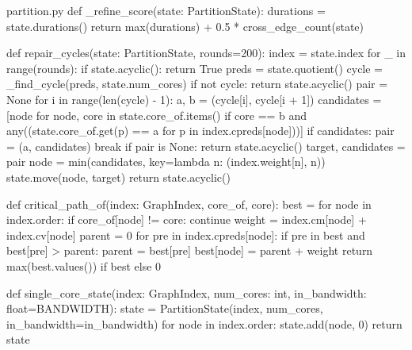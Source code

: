 \begin{Python}{partition.py}
def _refine_score(state: PartitionState):
    durations = state.durations()
    return max(durations) + 0.5 * cross_edge_count(state)

def repair_cycles(state: PartitionState, rounds=200):
    index = state.index
    for _ in range(rounds):
        if state.acyclic():
            return True
        preds = state.quotient()
        cycle = _find_cycle(preds, state.num_cores)
        if not cycle:
            return state.acyclic()
        pair = None
        for i in range(len(cycle) - 1):
            a, b = (cycle[i], cycle[i + 1])
            candidates = [node for node, core in state.core_of.items() if core == b and any((state.core_of.get(p) == a for p in index.cpreds[node]))]
            if candidates:
                pair = (a, candidates)
                break
        if pair is None:
            return state.acyclic()
        target, candidates = pair
        node = min(candidates, key=lambda n: (index.weight[n], n))
        state.move(node, target)
    return state.acyclic()

def critical_path_of(index: GraphIndex, core_of, core):
    best = {}
    for node in index.order:
        if core_of[node] != core:
            continue
        weight = index.cm[node] + index.cv[node]
        parent = 0
        for pre in index.cpreds[node]:
            if pre in best and best[pre] > parent:
                parent = best[pre]
        best[node] = parent + weight
    return max(best.values()) if best else 0

def single_core_state(index: GraphIndex, num_cores: int, in_bandwidth: float=BANDWIDTH):
    state = PartitionState(index, num_cores, in_bandwidth=in_bandwidth)
    for node in index.order:
        state.add(node, 0)
    return state


\end{Python}

